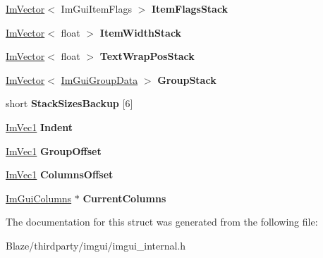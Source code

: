 \begin{DoxyCompactItemize}
\mbox{\label{structImGuiWindowTempData_ab3df41f54a3de26b5b53b92973e4fc93}} 
\hyperlink{structImVector}{Im\+Vector}$<$ Im\+Gui\+Item\+Flags $>$ {\bfseries Item\+Flags\+Stack}
\item 
\mbox{\label{structImGuiWindowTempData_ac3be9bc08a4ab80a67c6ebc48f4e578a}} 
\hyperlink{structImVector}{Im\+Vector}$<$ float $>$ {\bfseries Item\+Width\+Stack}
\item 
\mbox{\label{structImGuiWindowTempData_aa65230cd1350ef584984919a7fa4c92b}} 
\hyperlink{structImVector}{Im\+Vector}$<$ float $>$ {\bfseries Text\+Wrap\+Pos\+Stack}
\item 
\mbox{\label{structImGuiWindowTempData_ab25fa1835e4cabf3edc642ab67f4ed8b}} 
\hyperlink{structImVector}{Im\+Vector}$<$ \hyperlink{structImGuiGroupData}{Im\+Gui\+Group\+Data} $>$ {\bfseries Group\+Stack}
\item 
\mbox{\label{structImGuiWindowTempData_a9f8d653faec34953616d1369fa843138}} 
short {\bfseries Stack\+Sizes\+Backup} \mbox{[}6\mbox{]}
\item 
\mbox{\label{structImGuiWindowTempData_a1ed2e037a987c8fc7ecdc4f5888657b5}} 
\hyperlink{structImVec1}{Im\+Vec1} {\bfseries Indent}
\item 
\mbox{\label{structImGuiWindowTempData_a29dbe26f59a7a8b667cc21a3ea3332a9}} 
\hyperlink{structImVec1}{Im\+Vec1} {\bfseries Group\+Offset}
\item 
\mbox{\label{structImGuiWindowTempData_af86ba9662f7aeb95c49e785d941f4c69}} 
\hyperlink{structImVec1}{Im\+Vec1} {\bfseries Columns\+Offset}
\item 
\mbox{\label{structImGuiWindowTempData_ada6e121b5b7cde78d30a112163bd7585}} 
\hyperlink{structImGuiColumns}{Im\+Gui\+Columns} $\ast$ {\bfseries Current\+Columns}
\end{DoxyCompactItemize}


The documentation for this struct was generated from the following file\+:\begin{DoxyCompactItemize}
\item 
Blaze/thirdparty/imgui/imgui\+\_\+internal.\+h\end{DoxyCompactItemize}
